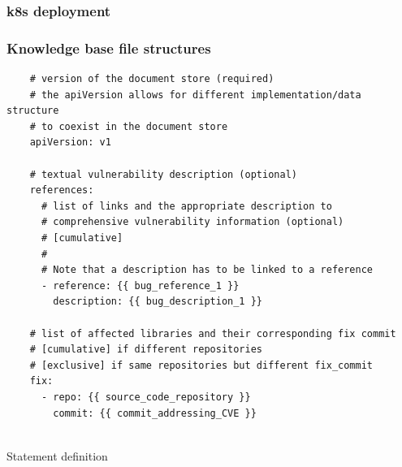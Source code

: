 \documentclass[11pt]{article}
\begin{document}

\subsubsection{k8s deployment}


\subsubsection{Knowledge base file structures}

\begin{listing}[H]
    \begin{verbatim}
    # version of the document store (required)
    # the apiVersion allows for different implementation/data structure
    # to coexist in the document store
    apiVersion: v1
    
    # textual vulnerability description (optional)
    references:
      # list of links and the appropriate description to 
      # comprehensive vulnerability information (optional)
      # [cumulative]
      # 
      # Note that a description has to be linked to a reference 
      - reference: {{ bug_reference_1 }}
        description: {{ bug_description_1 }}
     
    # list of affected libraries and their corresponding fix commit
    # [cumulative] if different repositories
    # [exclusive] if same repositories but different fix_commit
    fix:
      - repo: {{ source_code_repository }}
        commit: {{ commit_addressing_CVE }}
    
    \end{verbatim}
    \caption{Statement definition}
    \label{list:statement}
\end{listing}
\end{document}
